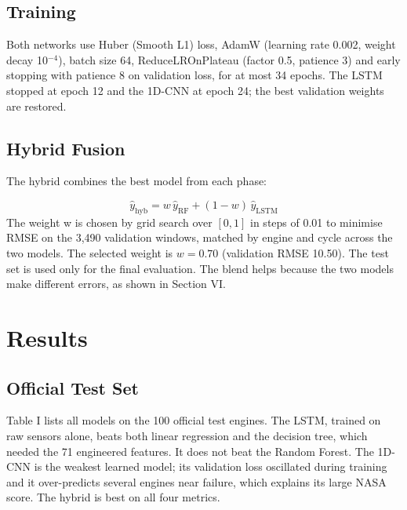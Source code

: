 \documentclass[conference]{IEEEtran}
\begin{document}
\subsection{Training}
Both networks use Huber (Smooth L1) loss, AdamW (learning rate 0.002, weight decay 10$^{-4}$), batch size 64, ReduceLROnPlateau (factor 0.5, patience 3) and early stopping with patience 8 on validation loss, for at most 34 epochs. The LSTM stopped at epoch 12 and the 1D-CNN at epoch 24; the best validation weights are restored.

\subsection{Hybrid Fusion}
The hybrid combines the best model from each phase:

\begin{equation}
\hat{y}_{\mathrm{hyb}} = w\,\hat{y}_{\mathrm{RF}} + (1-w)\,\hat{y}_{\mathrm{LSTM}}
\label{eq2}
\end{equation}
The weight w is chosen by grid search over $[0, 1]$ in steps of 0.01 to minimise RMSE on the 3,490 validation windows, matched by engine and cycle across the two models. The selected weight is $w = 0.70$ (validation RMSE 10.50). The test set is used only for the final evaluation. The blend helps because the two models make different errors, as shown in Section VI.


\section{Results}
\subsection{Official Test Set}
Table I lists all models on the 100 official test engines. The LSTM, trained on raw sensors alone, beats both linear regression and the decision tree, which needed the 71 engineered features. It does not beat the Random Forest. The 1D-CNN is the weakest learned model; its validation loss oscillated during training and it over-predicts several engines near failure, which explains its large NASA score. The hybrid is best on all four metrics.
\end{document}
